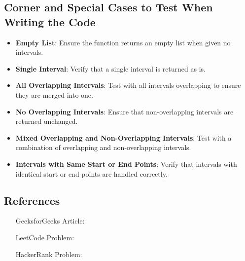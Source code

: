 \subsection*{Corner and Special Cases to Test When Writing the Code}
\begin{itemize}
    \item \textbf{Empty List}: Ensure the function returns an empty list when given no intervals.
    
    \item \textbf{Single Interval}: Verify that a single interval is returned as is.
    
    \item \textbf{All Overlapping Intervals}: Test with all intervals overlapping to ensure they are merged into one.
    
    \item \textbf{No Overlapping Intervals}: Ensure that non-overlapping intervals are returned unchanged.
    
    \item \textbf{Mixed Overlapping and Non-Overlapping Intervals}: Test with a combination of overlapping and non-overlapping intervals.
    
    \item \textbf{Intervals with Same Start or End Points}: Verify that intervals with identical start or end points are handled correctly.
\end{itemize}

\subsection*{References}
\begin{itemize}
    \item [GeeksforGeeks Article:] 
    \item [LeetCode Problem:] 
    \item [HackerRank Problem:] 
\end{itemize}

